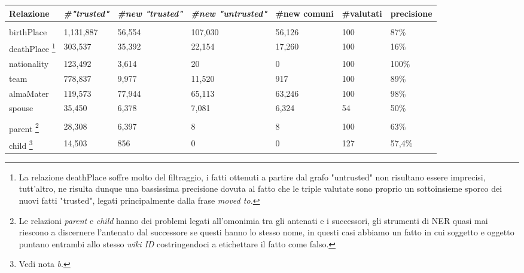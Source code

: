 \documentclass[10pt,a4paper,twocolumn]{article}
\begin{document}
\begin{table}[t]
	\centering
	\begin{minipage}{\textwidth}
	
	\begin{tabular}{lllllll}
		Relazione & \textit{\#"trusted"} & \textit{\#new "trusted"} & \textit{\#new "untrusted"} & \#new comuni & \#valutati & precisione \\
		\hline \\
		birthPlace           & 1,131,887            & 56,554                   & 107,030                    & 56,126       & 100        & 87\%       \\
		deathPlace \footnote{La relazione deathPlace soffre molto del filtraggio, i fatti ottenuti a partire dal grafo "untrusted" non risultano essere imprecisi, tutt'altro, ne risulta dunque una bassissima precisione dovuta al fatto che le triple valutate sono proprio un sottoinsieme sporco dei nuovi fatti "trusted", legati principalmente dalla frase \textit{moved to.}}           & 303,537              & 35,392                   & 22,154                     & 17,260       & 100        & 16\%       \\
		nationality          & 123,492              & 3,614                    & 20                         & 0            & 100        & 100\%      \\
		team                 & 778,837              & 9,977                    & 11,520                     & 917          & 100        & 89\%       \\
	almaMater           & 119,573              & 77,944                   & 65,113                     & 63,246       & 100        & 98\%       \\
	spouse               & 35,450               & 6,378                    & 7,081                      & 6,324        & 54         & 50\%       \\
	\hline \\
	parent \footnote{Le relazioni \textit{parent} e \textit{child} hanno dei problemi legati all'omonimia tra gli antenati e i successori, gli strumenti di NER quasi mai riescono a discernere l'antenato dal successore se questi hanno lo stesso nome, in questi casi abbiamo un fatto in cui soggetto e oggetto puntano entrambi allo stesso \textit{wiki ID} costringendoci a etichettare il fatto come falso.}               & 28,308               & 6,397                    & 8                          & 8            & 100        & 63\%       \\
	child \footnote{Vedi nota \textit{b}.}                & 14,503               & 856                      & 0                          & 0            & 127        & 57,4\%     \\

\end{tabular}
\end{minipage}
\end{table}
\end{document}
